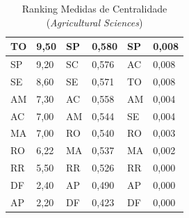 \begin{table}[H]
\begin{tabular}{|l|l|l|l|l|l|}
		TO                          & 9,50                          & SP                     & 0,580                                    & SP                              & 0,008                             \\ \hline
		SP                          & 9,20                          & SC                     & 0,576                                    & AC                              & 0,008                             \\ \hline
		SE                          & 8,60                          & SE                     & 0,571                                    & TO                              & 0,008                             \\ \hline
		AM                          & 7,30                          & AC                     & 0,558                                    & AM                              & 0,004                             \\ \hline
		AC                          & 7,00                          & AM                     & 0,544                                    & SE                              & 0,004                             \\ \hline
		MA                          & 7,00                          & RO                     & 0,540                                    & RO                              & 0,003                             \\ \hline
		RO                          & 6,22                          & MA                     & 0,537                                    & MA                              & 0,002                             \\ \hline
		RR                          & 5,50                          & RR                     & 0,526                                    & RR                              & 0,000                             \\ \hline
		DF                          & 2,40                          & AP                     & 0,490                                    & AP                              & 0,000                             \\ \hline
		AP                          & 2,20                          & DF                     & 0,423                                    & DF                              & 0,000                             \\ \hline
	\end{tabular}
	\caption{Ranking Medidas de Centralidade (\textit{Agricultural Sciences})}
	\label{rank-agri}
\end{table}


